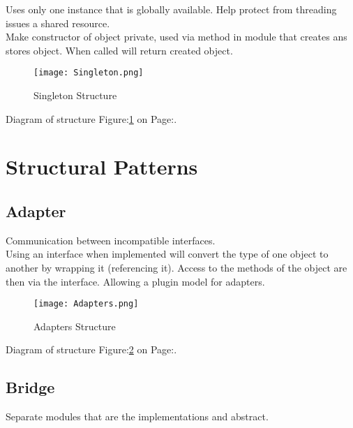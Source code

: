 \documentclass[11pt]{scrartcl} %
\begin{document}
Uses only one instance that is globally available. Help protect from threading issues a shared resource.\\

Make constructor of object private, used via method in module that creates ans stores object. When called
will return created object.\\

\begin{figure}[h] %
	\centering
	\texttt{[image: Singleton.png]} %
	\caption{Singleton Structure}
	\label{Singleton Structure}
\end{figure}

Diagram of structure Figure:\ref{Singleton Structure} on Page:\pageref{Singleton Structure}.

\section{Structural Patterns}

\subsection{Adapter}

Communication between incompatible interfaces.\\

Using an interface when implemented will convert the type of one object to another by wrapping it (referencing it).
Access to the methods of the object are then via the interface. Allowing a plugin model for adapters.\\

\begin{figure}[h] %
	\centering
	\texttt{[image: Adapters.png]} %
	\caption{Adapters Structure}
	\label{Adapters Structure}
\end{figure}

Diagram of structure Figure:\ref{Adapters Structure} on Page:\pageref{Adapters Structure}.

\subsection{Bridge}

Separate modules that are the implementations and abstract.\\
\end{document}
